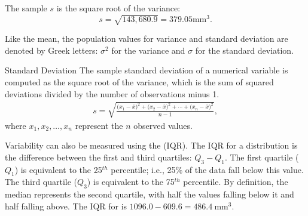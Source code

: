 The sample  $s$ is the square root of the variance:
$$s=\sqrt{143,680.9} = 379.05 \textrm{mm}^{3}.$$

Like the mean, the population values for variance and standard deviation are denoted by Greek letters:
$\sigma_{}^2$ for the variance and $\sigma$ for the standard deviation.


\begin{onebox}{Standard Deviation}
		The sample standard deviation of a numerical variable is computed as the square root of the variance, which is the sum of squared deviations divided by the number of observations minus 1.
		\begin{eqnarray}
		s = \sqrt{\frac{({x_1 - \overline{x})}^{2}+({x_2 - \overline{x})}^{2}+\cdots+({x_n - \overline{x})}^{2}}{n-1}},
		\label{SDEquation}
		\end{eqnarray}
		where $x_1, x_2, \dots, x_n$ represent the $n$ observed values.
\end{onebox}

\textD{\newpage}

Variability can also be measured using the  (IQR). The IQR for a distribution is the difference between the first and third quartiles: $Q_3 - Q_1$. The first quartile ($Q_1$) is equivalent to the 25$^{th}$ percentile; i.e., 25\% of the data fall below this value. The third quartile ($Q_3$) is equivalent to the 75$^{th}$ percentile. By definition, the median represents the second quartile, with half the values falling below it and half falling above. The IQR for  is $1096.0 - 609.6 = 486.4\ \textrm{mm}^{3}$.  

